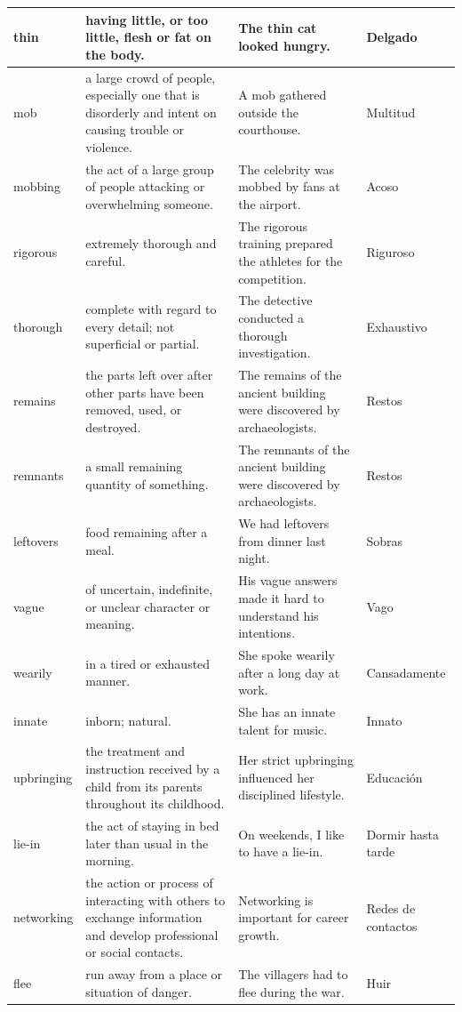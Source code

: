 \begin{longtable}{p{}p{}p{}p{}}
thin & having little, or too little, flesh or fat on the body. & The thin cat looked hungry. & Delgado \\
\hline
mob & a large crowd of people, especially one that is disorderly and intent on causing trouble or violence. & A mob gathered outside the courthouse. & Multitud \\
\hline
mobbing & the act of a large group of people attacking or overwhelming someone. & The celebrity was mobbed by fans at the airport. & Acoso \\
\hline
rigorous & extremely thorough and careful. & The rigorous training prepared the athletes for the competition. & Riguroso \\
\hline
thorough & complete with regard to every detail; not superficial or partial. & The detective conducted a thorough investigation. & Exhaustivo \\
\hline
remains & the parts left over after other parts have been removed, used, or destroyed. & The remains of the ancient building were discovered by archaeologists. & Restos \\
\hline
remnants & a small remaining quantity of something. & The remnants of the ancient building were discovered by archaeologists. & Restos \\
\hline
leftovers & food remaining after a meal. & We had leftovers from dinner last night. & Sobras \\
\hline
vague & of uncertain, indefinite, or unclear character or meaning. & His vague answers made it hard to understand his intentions. & Vago \\
\hline
wearily & in a tired or exhausted manner. & She spoke wearily after a long day at work. & Cansadamente \\
\hline
innate & inborn; natural. & She has an innate talent for music. & Innato \\
\hline
upbringing & the treatment and instruction received by a child from its parents throughout its childhood. & Her strict upbringing influenced her disciplined lifestyle. & Educación \\
\hline
lie-in & the act of staying in bed later than usual in the morning. & On weekends, I like to have a lie-in. & Dormir hasta tarde \\
\hline
networking & the action or process of interacting with others to exchange information and develop professional or social contacts. & Networking is important for career growth. & Redes de contactos \\
\hline
flee & run away from a place or situation of danger. & The villagers had to flee during the war. & Huir \\

\end{longtable}
